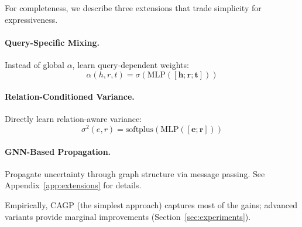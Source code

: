 For completeness, we describe three extensions that trade simplicity for expressiveness.

\paragraph{Query-Specific Mixing.} Instead of global $\alpha$, learn query-dependent weights:
\begin{equation}
    \alpha(h,r,t) = \sigma\left(\text{MLP}([\mathbf{h}; \mathbf{r}; \mathbf{t}])\right)
\end{equation}

\paragraph{Relation-Conditioned Variance.} Directly learn relation-aware variance:
\begin{equation}
    \sigma^2(e,r) = \text{softplus}\left(\text{MLP}([\mathbf{e}; \mathbf{r}])\right)
\end{equation}

\paragraph{GNN-Based Propagation.} Propagate uncertainty through graph structure via message passing. See Appendix~\ref{app:extensions} for details.

Empirically, CAGP (the simplest approach) captures most of the gains; advanced variants provide marginal improvements (Section~\ref{sec:experiments}).

